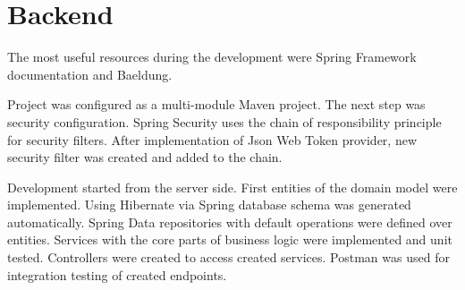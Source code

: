 
\section{Backend}\label{sec:backend}

The most useful resources during the development were Spring Framework documentation and Baeldung.\cite{spring-doc, baeldung}

Project was configured as a multi-module Maven project.
The next step was security configuration.
Spring Security uses the chain of responsibility principle for security filters.
After implementation of Json Web Token provider, new security filter was created and added to the chain.

Development started from the server side.
First entities of the domain model were implemented.
Using Hibernate via Spring database schema was generated automatically.
Spring Data repositories with default operations were defined over entities.
Services with the core parts of business logic were implemented and unit tested.
Controllers were created to access created services.
Postman was used for integration testing of created endpoints.